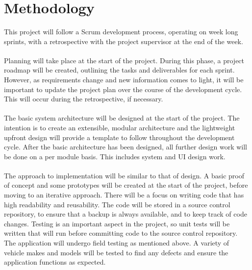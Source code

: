 \section{Methodology}
	\paragraph{}{
	This project will follow a Scrum development process, operating on week long sprints, with a retrospective with the project supervisor at the end of the week.
	}
	\paragraph{}{
	Planning will take place at the start of the project. During this phase, a project roadmap will be created, outlining the tasks and deliverables for each sprint. However, as requirements change and new information comes to light, it will be important to update the project plan over the course of the development cycle. This will occur during the retrospective, if necessary.
	}
	\paragraph{}{
	The basic system architecture will be designed at the start of the project. The intention is to create an extensible, modular architecture and the lightweight upfront design will provide a template to follow throughout the development cycle. After the basic architecture has been designed, all further design work will be done on a per module basis. This includes system and UI design work.
	}
	\paragraph{}{
 	The approach to implementation will be similar to that of design. A basic proof of concept and some prototypes will be created at the start of the project, before moving to an iterative approach. There will be a focus on writing code that has high readability and reusability. The code will be stored in a source control repository, to ensure that a backup is always available, and to keep track of code changes. Testing is an important aspect in the project, so unit tests will be written that will run before committing code to the source control repository. The application will undergo field testing as mentioned above. A variety of vehicle makes and models will be tested to find any defects and ensure the application functions as expected. 
	}

